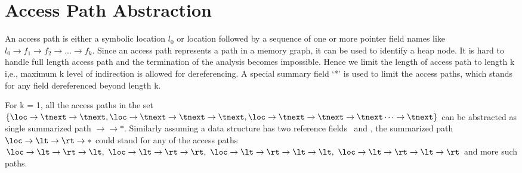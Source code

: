 \section{Access Path Abstraction}
\label{sec:accesspath}
An access path is either a symbolic location $l_0$ or location followed by a 
sequence of one or more pointer field names like $l_0\rightarrow f_1 \rightarrow 
f_2\rightarrow ...\rightarrow f_k$.  
Since an 
access path represents a path in a memory graph, it can be 
used to identify a heap node. It is hard to handle full 
length access path and the termination of the analysis becomes impossible. Hence 
we limit the length of access path to length k i,e., maximum k level of indirection 
is allowed for dereferencing. A special summary field `*' is used to limit the 
access paths, which stands for any field dereferenced beyond length k.
\begin{example}{\rm
For k = 1, all the access paths in the set $\{\loc\rightarrow\tnext\rightarrow\tnext,
  \loc\rightarrow\tnext\rightarrow\tnext\rightarrow\tnext,
  \loc\rightarrow\tnext\rightarrow\tnext
    \rightarrow\tnext\cdots\rightarrow\tnext\}$ can be abstracted as single summarized path \loc$\rightarrow$\tnext$\rightarrow{*}$. 
    Similarly assuming a data structure has two reference fields
  \lt\ and \rt, the summarized path
  $\loc\rightarrow\lt\rightarrow\rt\rightarrow{*}$ could
  stand for any of the access paths
  $\loc\rightarrow\lt\rightarrow\rt\rightarrow\lt,\ \loc\rightarrow\lt\rightarrow\rt\rightarrow\rt,\ \loc\rightarrow\lt\rightarrow\rt\rightarrow\lt\rightarrow\lt,\ \loc\rightarrow\lt\rightarrow\rt\rightarrow\lt\rightarrow\rt$
  and more such paths.
}
\hfill\psframebox{}  \end{example}
%
